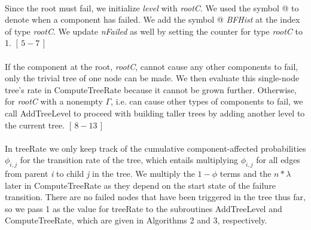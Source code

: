 \documentclass[12pt]{article}
\newcommand{\varName}[1]{\textrm{\it#1}}
\newcommand{\citeBlock}[2]{$[\,#1 - #2\,]$}
\begin{document}
\paragraph{} Since the root must fail, we initialize \textit{level} with \textit{rootC}. We used the symbol @ to denote when a component has failed. We add the symbol @ \textit{BFHist} at the index of type \textit{rootC}. We update \textit{nFailed} as well by setting the counter for type \varName{rootC} to 1. \citeBlock{5}{7}

\paragraph{} If the component at the root, \textit{rootC}, cannot cause any other components to fail, only the trivial tree of one node can be made. We then evaluate this single-node tree's rate in ComputeTreeRate because it cannot be grown further. Otherwise, for \textit{rootC} with a nonempty $\Gamma$, i.e. can cause other types of components to fail, we call AddTreeLevel to proceed with building taller trees by adding another level to the current tree. \citeBlock{8}{13}

\paragraph{} In treeRate we only keep track of the cumulative component-affected probabilities $\phi_{i,j}$ for the transition rate of the tree, which entails multiplying $\phi_{i, j}$ for all edges from parent \varName{i} to child \varName{j} in the tree. We multiply the $1-\phi$ terms and the $n * \lambda$ later in ComputeTreeRate as they depend on the start state of the failure transition. There are no failed nodes that have been triggered in the tree thus far, so we pass 1 as the value for treeRate to the subroutines AddTreeLevel and ComputeTreeRate, which are given in Algorithms 2 and 3, respectively.
\end{document}
